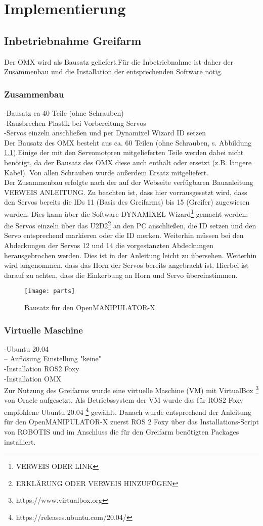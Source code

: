\chapter{Implementierung}

\section {Inbetriebnahme Greifarm}
Der OMX wird als Bausatz geliefert.Für die Inbetriebnahme ist daher der Zusammenbau und die Installation der entsprechenden Software  nötig. 
\subsection{Zusammenbau}
-Bausatz ca 40 Teile (ohne Schrauben)\\
-Rausbrechen Plastik bei Vorbereitung Servos\\
-Servos einzeln anschließen und per Dynamixel Wizard ID setzen\\
Der Bausatz des OMX besteht aus ca. 60 Teilen (ohne Schrauben, s. Abbildung \ref{fig:omxparts}).Einige der mit den Servomotoren mitgelieferten Teile werden dabei nicht benötigt, da der Bausatz des OMX diese auch enthält oder ersetzt (z.B. längere Kabel). Von allen Schrauben wurde außerdem Ersatz mitgeliefert.\\
Der Zusammenbau erfolgte nach der auf der Webseite verfügbaren Bauanleitung VERWEIS ANLEITUNG. Zu beachten ist, dass hier vorrausgesetzt wird, dass den Servos bereits die IDs 11 (Basis des Greifarms) bis 15 (Greifer) zugewiesen wurden. Dies kann über die Software DYNAMIXEL Wizard{\footnote{VERWEIS ODER LINK}} gemacht werden: die Servos einzeln über das U2D2{\footnote{ERKLÄRUNG ODER VERWEIS HINZUFÜGEN}} an den PC anschließen, die ID setzen und den Servo entsprechend markieren oder die ID merken. Weiterhin müssen bei den Abdeckungen der Servos 12 und 14 die vorgestanzten Abdeckungen herausgebrochen werden. Dies ist in der Anleitung leicht zu übersehen. Weiterhin wird angenommen, dass das Horn der Servos bereits angebracht ist. Hierbei ist darauf zu achten, dass die Einkerbung an Horn und Servo übereinstimmen.
\begin{figure}[h!]
\centering
\texttt{[image: parts]}
\caption{Bausatz für den OpenMANIPULATOR-X}
\label{fig:omxparts}
\end{figure}
\subsection{Virtuelle Maschine}
-Ubuntu 20.04\\
-- Auflösung Einstellung "keine"\\
-Installation ROS2 Foxy\\
-Installation OMX\\
Zur Nutzung des Greifarms wurde eine virtuelle Maschine (VM) mit VirtualBox {\footnote{https://www.virtualbox.org}} von Oracle aufgesetzt. Als Betriebssystem der VM wurde das für ROS2 Foxy empfohlene{\cite{foxyreq}} Ubuntu 20.04 {\footnote{https://releases.ubuntu.com/20.04/}} gewählt. Danach wurde entsprechend der Anleitung für den OpenMANIPULATOR-X {\cite{foxyinstall}} zuerst ROS 2 Foxy über das Installations-Script von ROBOTIS und im Anschluss die für den Greifarm benötigten Packages  installiert.
